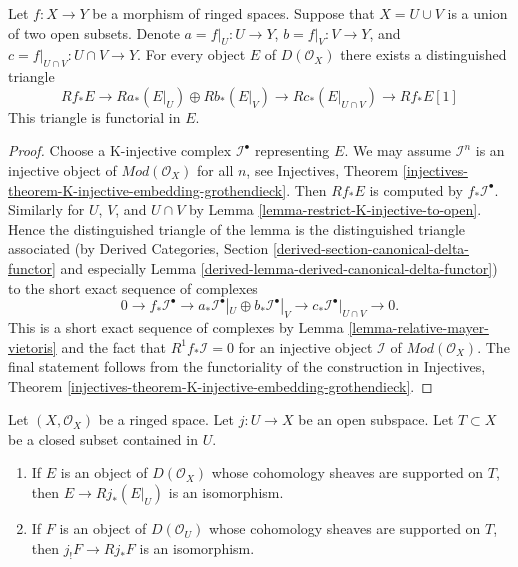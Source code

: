 \begin{lemma}
\label{lemma-unbounded-relative-mayer-vietoris}
Let $f : X \to Y$ be a morphism of ringed spaces.
Suppose that $X = U \cup V$ is a union of two open subsets.
Denote $a = f|_U : U \to Y$, $b = f|_V : V \to Y$, and
$c = f|_{U \cap V} : U \cap V \to Y$.
For every object $E$ of $D(\mathcal{O}_X)$ there exists a
distinguished triangle
$$
Rf_*E \to
Ra_*(E|_U) \oplus Rb_*(E|_V) \to
Rc_*(E|_{U \cap V}) \to
Rf_*E[1]
$$
This triangle is functorial in $E$.
\end{lemma}

\begin{proof}
Choose a K-injective complex $\mathcal{I}^\bullet$
representing $E$. We may assume $\mathcal{I}^n$ is an injective
object of $\textit{Mod}(\mathcal{O}_X)$ for all $n$, see
Injectives, Theorem
\ref{injectives-theorem-K-injective-embedding-grothendieck}.
Then $Rf_*E$ is computed by $f_*\mathcal{I}^\bullet$.
Similarly for $U$, $V$, and $U \cap V$ by
Lemma \ref{lemma-restrict-K-injective-to-open}.
Hence the distinguished triangle of the lemma is the distinguished
triangle associated (by
Derived Categories, Section
\ref{derived-section-canonical-delta-functor} and especially
Lemma \ref{derived-lemma-derived-canonical-delta-functor})
to the short exact sequence of complexes
$$
0 \to
f_*\mathcal{I}^\bullet \to
a_*\mathcal{I}^\bullet|_U \oplus b_*\mathcal{I}^\bullet|_V \to
c_*\mathcal{I}^\bullet|_{U \cap V} \to
0.
$$
This is a short exact sequence of complexes by
Lemma \ref{lemma-relative-mayer-vietoris}
and the fact that $R^1f_*\mathcal{I} = 0$
for an injective object $\mathcal{I}$ of $\textit{Mod}(\mathcal{O}_X)$.
The final statement follows from the functoriality of the construction
in Injectives, Theorem
\ref{injectives-theorem-K-injective-embedding-grothendieck}.
\end{proof}

\begin{lemma}
\label{lemma-pushforward-restriction}
Let $(X, \mathcal{O}_X)$ be a ringed space. Let $j : U \to X$ be an
open subspace. Let $T \subset X$ be a closed subset contained in $U$.
\begin{enumerate}
\item If $E$ is an object of $D(\mathcal{O}_X)$ whose cohomology sheaves
are supported on $T$, then $E \to Rj_*(E|_U)$ is an isomorphism.
\item If $F$ is an object of $D(\mathcal{O}_U)$ whose cohomology sheaves
are supported on $T$, then $j_!F \to Rj_*F$ is an isomorphism.
\end{enumerate}
\end{lemma}

